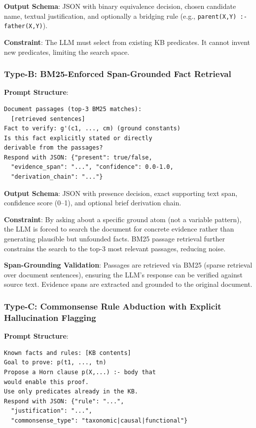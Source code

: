 \documentclass[11pt,letterpaper]{article}
\begin{document}
\textbf{Output Schema}: JSON with binary equivalence decision, chosen candidate name, textual justification, and optionally a bridging rule (e.g., \texttt{parent(X,Y) :- father(X,Y)}).

\textbf{Constraint}: The LLM must select from existing KB predicates. It cannot invent new predicates, limiting the search space.

\subsubsection{Type-B: BM25-Enforced Span-Grounded Fact Retrieval}

\textbf{Prompt Structure}:
\begin{lstlisting}
Document passages (top-3 BM25 matches):
  [retrieved sentences]
Fact to verify: g'(c1, ..., cm) (ground constants)
Is this fact explicitly stated or directly
derivable from the passages?
Respond with JSON: {"present": true/false,
  "evidence_span": "...", "confidence": 0.0-1.0,
  "derivation_chain": "..."}
\end{lstlisting}

\textbf{Output Schema}: JSON with presence decision, exact supporting text span, confidence score (0--1), and optional brief derivation chain.

\textbf{Constraint}: By asking about a specific ground atom (not a variable pattern), the LLM is forced to search the document for concrete evidence rather than generating plausible but unfounded facts. BM25 passage retrieval further constrains the search to the top-3 most relevant passages, reducing noise.

\textbf{Span-Grounding Validation}: Passages are retrieved via BM25 (sparse retrieval over document sentences), ensuring the LLM's response can be verified against source text. Evidence spans are extracted and grounded to the original document.

\subsubsection{Type-C: Commonsense Rule Abduction with Explicit Hallucination Flagging}

\textbf{Prompt Structure}:
\begin{lstlisting}
Known facts and rules: [KB contents]
Goal to prove: p(t1, ..., tn)
Propose a Horn clause p(X,...) :- body that
would enable this proof.
Use only predicates already in the KB.
Respond with JSON: {"rule": "...",
  "justification": "...",
  "commonsense_type": "taxonomic|causal|functional"}
\end{lstlisting}
\end{document}
